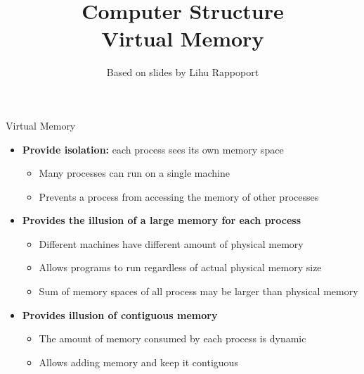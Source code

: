 \documentclass[aspectratio=169,12pt]{beamer}
\title{Computer Structure\\Virtual Memory}
\author{Based on slides by Lihu Rappoport}
\date{}
\begin{document}
\frame{\titlepage}

\begin{frame}{Virtual Memory}
\begin{itemize}
\item \textbf{Provide isolation:} each process sees its own memory space
    \begin{itemize}
    \item Many processes can run on a single machine
    \item Prevents a process from accessing the memory of other processes
    \end{itemize}
\item \textbf{Provides the illusion of a large memory for each process}
    \begin{itemize}
    \item Different machines have different amount of physical memory
    \item Allows programs to run regardless of actual physical memory size
    \item Sum of memory spaces of all process may be larger than physical memory
    \end{itemize}
\item \textbf{Provides illusion of contiguous memory}
    \begin{itemize}
    \item The amount of memory consumed by each process is dynamic
    \item Allows adding memory and keep it contiguous
    \end{itemize}
\end{itemize}
\end{frame}
\end{document}

